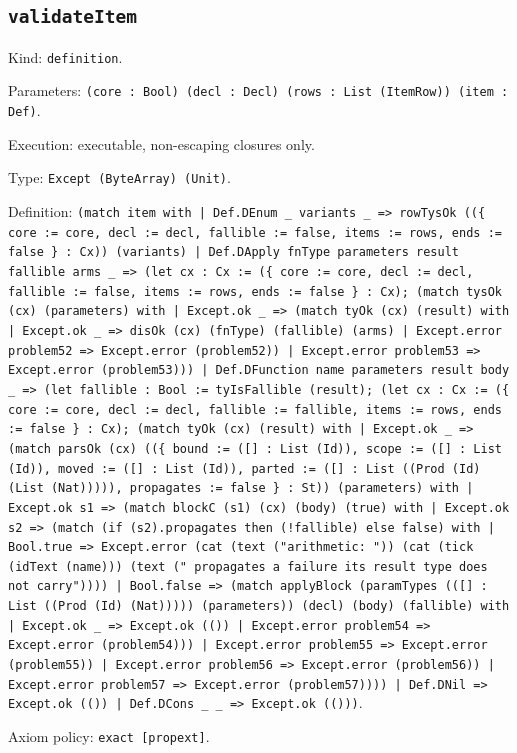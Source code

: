 \documentclass[11pt]{article}
\begin{document}
\subsection*{\texttt{validateItem}}
\noindent Kind: \texttt{definition}.\par
\noindent Parameters: \texttt{(core : Bool) (decl : Decl) (rows : List (ItemRow)) (item : Def)}.\par
\noindent Execution: executable, non-escaping closures only.\par
\noindent Type: \texttt{Except (ByteArray) (Unit)}.\par
\noindent Definition: \texttt{(match item with | Def.DEnum \_ variants \_ => rowTysOk ((\{ core := core, decl := decl, fallible := false, items := rows, ends := false \} : Cx)) (variants) | Def.DApply fnType parameters result fallible arms \_ => (let cx : Cx := (\{ core := core, decl := decl, fallible := false, items := rows, ends := false \} : Cx); (match tysOk (cx) (parameters) with | Except.ok \_ => (match tyOk (cx) (result) with | Except.ok \_ => disOk (cx) (fnType) (fallible) (arms) | Except.error problem52 => Except.error (problem52)) | Except.error problem53 => Except.error (problem53))) | Def.DFunction name parameters result body \_ => (let fallible : Bool := tyIsFallible (result); (let cx : Cx := (\{ core := core, decl := decl, fallible := fallible, items := rows, ends := false \} : Cx); (match tyOk (cx) (result) with | Except.ok \_ => (match parsOk (cx) ((\{ bound := ([] : List (Id)), scope := ([] : List (Id)), moved := ([] : List (Id)), parted := ([] : List ((Prod (Id) (List (Nat))))), propagates := false \} : St)) (parameters) with | Except.ok s1 => (match blockC (s1) (cx) (body) (true) with | Except.ok s2 => (match (if (s2).propagates then (!fallible) else false) with | Bool.true => Except.error (cat (text ("arithmetic: ")) (cat (tick (idText (name))) (text (" propagates a failure its result type does not carry")))) | Bool.false => (match applyBlock (paramTypes (([] : List ((Prod (Id) (Nat))))) (parameters)) (decl) (body) (fallible) with | Except.ok \_ => Except.ok (()) | Except.error problem54 => Except.error (problem54))) | Except.error problem55 => Except.error (problem55)) | Except.error problem56 => Except.error (problem56)) | Except.error problem57 => Except.error (problem57)))) | Def.DNil => Except.ok (()) | Def.DCons \_ \_ => Except.ok (()))}.\par
\noindent Axiom policy: \texttt{exact [propext]}.\par
\end{document}
